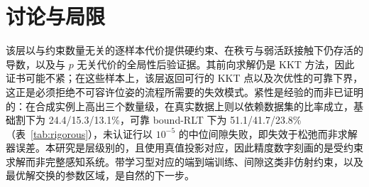 \section{讨论与局限}\label{sec:discussion}

该层以与约束数量无关的逐样本代价提供硬约束、在秩亏与弱活跃接触下仍存活的导数，以及与 $p$ 无关代价的全局性后验证据。其前向求解仍是 KKT 方法，因此证书可能不紧；在这些样本上，该层返回可行的 KKT 点以及次优性的可靠下界，这正是必须拒绝不可容许位姿的流程所需要的失效模式。紧性是经验的而非已证明的：在合成实例上高出三个数量级，在真实数据上则以依赖数据集的比率成立，基础割下为 24.4/15.3/13.1\%，可靠 bound-RLT 下为 51.1/41.7/23.8\%（表~\ref{tab:rigorous}），未认证行以 $10^{-5}$ 的中位间隙失败，即失效于松弛而非求解器误差。本研究是层级别的，且使用真值投影对应，因此精度数字刻画的是受约束求解而非完整感知系统。带学习型对应的端到端训练、间隙这类非仿射约束，以及最优解交换的参数区域，是自然的下一步。
